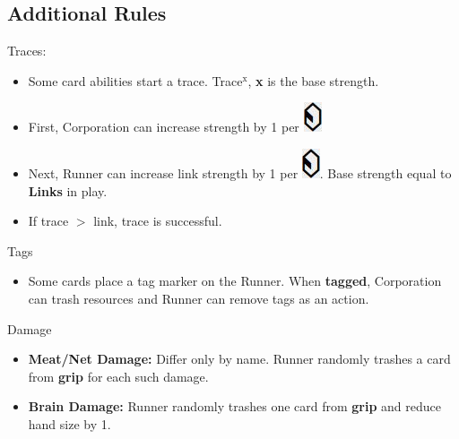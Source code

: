 \documentclass[12pt]{article}
\newenvironment{itemizeCustom}
{\begin{itemize}
  \setlength{\itemsep}{1pt}
  \setlength{\parskip}{0pt}
  \setlength{\parsep}{0pt}}
{\end{itemize}}
\newcommand{\credit}{\includegraphics[scale=0.40]{images/creditLarge.jpg}\hspace{0.3em}}
\begin{document}
\begin{multicols*}{2}
\section*{Additional Rules}
Traces:
\begin{itemizeCustom}
	\item Some card abilities start a trace. Trace$^{\textrm{x}}$, \textbf{x} is the base strength.
	\item First, Corporation can increase strength by 1 per \credit
	\item Next, Runner can increase link strength by 1 per \credit. Base strength equal to \textbf{Links} in play.
	\item If trace $>$ link, trace is successful. 
\end{itemizeCustom}

Tags
\begin{itemizeCustom}
	\item Some cards place a tag marker on the Runner. When \textbf{tagged}, Corporation can trash resources and Runner can remove tags as an action.
\end{itemizeCustom}

Damage
\begin{itemizeCustom}
	\item \textbf{Meat/Net Damage:} Differ only by name. Runner randomly trashes a card from \textbf{grip} for each such damage.
	\item \textbf{Brain Damage:} Runner randomly trashes one card from \textbf{grip} and reduce hand size by 1.
\end{itemizeCustom}

\end{multicols*}
\end{document}
